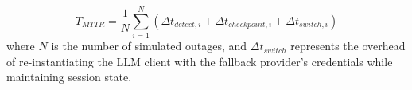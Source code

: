 \begin{equation}
\label{eq:mttr}
T_{MTTR} = \frac{1}{N} \sum_{i=1}^N \left( \Delta t_{detect, i} + \Delta t_{checkpoint, i} + \Delta t_{switch, i} \right)
\end{equation}
where $N$ is the number of simulated outages, and $\Delta t_{switch}$ represents the overhead of re-instantiating the LLM client with the fallback provider's credentials while maintaining session state.
